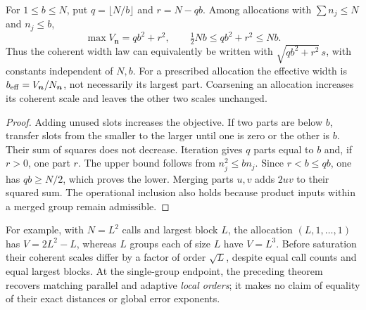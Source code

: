 \begin{corollary}\label{cor:profilebudget88}
For $1\le b\le N$, put $q=\lfloor N/b\rfloor$ and $r=N-qb$.
Among allocations with $\sum n_j\le N$ and $n_j\le b$,
\begin{equation}\label{eq:profilemax88}
 \max V_{\boldsymbol n}=qb^2+r^2,
 \qquad \tfrac12Nb\le qb^2+r^2\le Nb.
\end{equation}
Thus the coherent width law can equivalently be written with
$\sqrt{qb^2+r^2}\,s$, with constants independent of $N,b$.
For a prescribed allocation the effective width is
$b_{\rm eff}=V_{\boldsymbol n}/N_{\boldsymbol n}$, not necessarily
its largest part.  Coarsening an allocation increases its coherent
scale and leaves the other two scales unchanged.
\end{corollary}
\begin{proof}
Adding unused slots increases the objective.  If two parts are below
$b$, transfer slots from the smaller to the larger until one is zero
or the other is $b$.  Their sum of squares does not decrease.
Iteration gives $q$ parts equal to $b$ and, if $r>0$, one part $r$.
The upper bound follows from $n_j^2\le bn_j$.
Since $r<b\le qb$, one has $qb\ge N/2$, which proves the lower.
Merging parts $u,v$ adds $2uv$ to their squared sum.  The operational
inclusion also holds because product inputs within a merged group
remain admissible.
\end{proof}

For example, with $N=L^2$ calls and largest block $L$, the allocation
$(L,1,\ldots,1)$ has $V=2L^2-L$, whereas $L$ groups each of size $L$
have $V=L^3$.  Before saturation their coherent scales differ by a
factor of order $\sqrt L$, despite equal call counts and equal largest
blocks.  At the single-group endpoint, the preceding theorem recovers
matching parallel and adaptive \emph{local orders}; it makes no claim
of equality of their exact distances or global error exponents.
